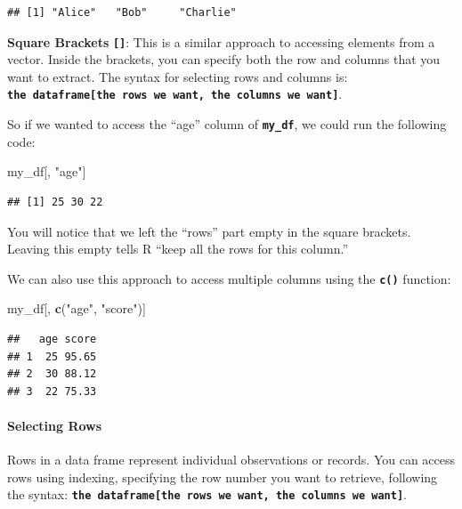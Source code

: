 \documentclass[
]{book}
\newenvironment{Shaded}{\begin{snugshade}}{\end{snugshade}}
\newcommand{\FunctionTok}[1]{\textcolor[rgb]{0.13,0.29,0.53}{\textbf{#1}}}
\newcommand{\NormalTok}[1]{#1}
\newcommand{\StringTok}[1]{\textcolor[rgb]{0.31,0.60,0.02}{#1}}
\begin{document}
\begin{verbatim}
## [1] "Alice"   "Bob"     "Charlie"
\end{verbatim}

\textbf{Square Brackets} \textbf{\texttt{{[}{]}}}: This is a similar approach to accessing elements from a vector. Inside the brackets, you can specify both the row and columns that you want to extract. The syntax for selecting rows and columns is: \textbf{\texttt{the\ dataframe{[}the\ rows\ we\ want,\ the\ columns\ we\ want{]}}}.

So if we wanted to access the ``age'' column of \textbf{\texttt{my\_df}}, we could run the following code:

\begin{Shaded}
\begin{Highlighting}[]
\NormalTok{my\_df[, }\StringTok{"age"}\NormalTok{]}
\end{Highlighting}
\end{Shaded}

\begin{verbatim}
## [1] 25 30 22
\end{verbatim}

You will notice that we left the ``rows'' part empty in the square brackets. Leaving this empty tells R ``keep all the rows for this column.''

We can also use this approach to access multiple columns using the \textbf{\texttt{c()}} function:

\begin{Shaded}
\begin{Highlighting}[]
\NormalTok{my\_df[, }\FunctionTok{c}\NormalTok{(}\StringTok{"age"}\NormalTok{, }\StringTok{"score"}\NormalTok{)]}
\end{Highlighting}
\end{Shaded}

\begin{verbatim}
##   age score
## 1  25 95.65
## 2  30 88.12
## 3  22 75.33
\end{verbatim}

\paragraph{Selecting Rows}\label{selecting-rows}

Rows in a data frame represent individual observations or records. You can access rows using indexing, specifying the row number you want to retrieve, following the syntax: \textbf{\texttt{the\ dataframe{[}the\ rows\ we\ want,\ the\ columns\ we\ want{]}}}.
\end{document}
